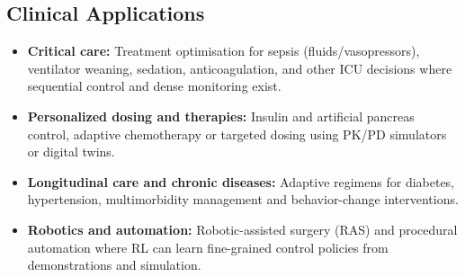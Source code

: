 \subsection*{Clinical Applications}
\begin{itemize}
    \item \textbf{Critical care:} Treatment optimisation for sepsis (fluids/vasopressors), ventilator weaning, sedation, anticoagulation, and other ICU decisions where sequential control and dense monitoring exist.
    \item \textbf{Personalized dosing and therapies:} Insulin and artificial pancreas control, adaptive chemotherapy or targeted dosing using PK/PD simulators or digital twins.
    \item \textbf{Longitudinal care and chronic diseases:} Adaptive regimens for diabetes, hypertension, multimorbidity management and behavior-change interventions.
    \item \textbf{Robotics and automation:} Robotic-assisted surgery (RAS) and procedural automation where RL can learn fine-grained control policies from demonstrations and simulation.
\end{itemize}

